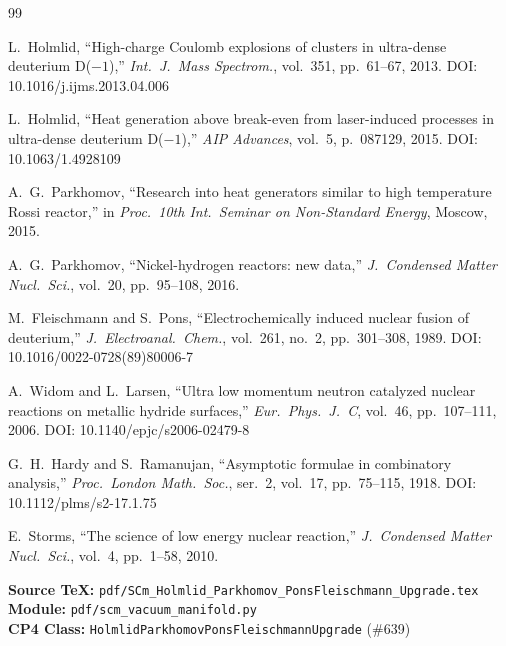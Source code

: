 \documentclass[11pt,a4paper]{article}
\begin{document}
\begin{thebibliography}{99}

L.~Holmlid,
``High-charge Coulomb explosions of clusters in ultra-dense deuterium D($-1$),''
\textit{Int.\ J.\ Mass Spectrom.}, vol.~351, pp.~61--67, 2013.
\newblock DOI: 10.1016/j.ijms.2013.04.006

L.~Holmlid,
``Heat generation above break-even from laser-induced processes in ultra-dense
deuterium D($-1$),''
\textit{AIP Advances}, vol.~5, p.~087129, 2015.
\newblock DOI: 10.1063/1.4928109

A.~G.~Parkhomov,
``Research into heat generators similar to high temperature Rossi reactor,''
in \textit{Proc.\ 10th Int.\ Seminar on Non-Standard Energy}, Moscow, 2015.

A.~G.~Parkhomov,
``Nickel-hydrogen reactors: new data,''
\textit{J.\ Condensed Matter Nucl.\ Sci.}, vol.~20, pp.~95--108, 2016.

M.~Fleischmann and S.~Pons,
``Electrochemically induced nuclear fusion of deuterium,''
\textit{J.\ Electroanal.\ Chem.}, vol.~261, no.~2, pp.~301--308, 1989.
\newblock DOI: 10.1016/0022-0728(89)80006-7

A.~Widom and L.~Larsen,
``Ultra low momentum neutron catalyzed nuclear reactions on metallic hydride
surfaces,''
\textit{Eur.\ Phys.\ J.\ C}, vol.~46, pp.~107--111, 2006.
\newblock DOI: 10.1140/epjc/s2006-02479-8

G.~H.~Hardy and S.~Ramanujan,
``Asymptotic formulae in combinatory analysis,''
\textit{Proc.\ London Math.\ Soc.}, ser.~2, vol.~17, pp.~75--115, 1918.
\newblock DOI: 10.1112/plms/s2-17.1.75

E.~Storms,
``The science of low energy nuclear reaction,''
\textit{J.\ Condensed Matter Nucl.\ Sci.}, vol.~4, pp.~1--58, 2010.

\end{thebibliography}

\bigskip\noindent
\textbf{Source TeX:} \texttt{pdf/SCm\_Holmlid\_Parkhomov\_PonsFleischmann\_Upgrade.tex}\\
\textbf{Module:} \texttt{pdf/scm\_vacuum\_manifold.py}\\
\textbf{CP4 Class:} \texttt{HolmlidParkhomovPonsFleischmannUpgrade} (\#639)
\end{document}
